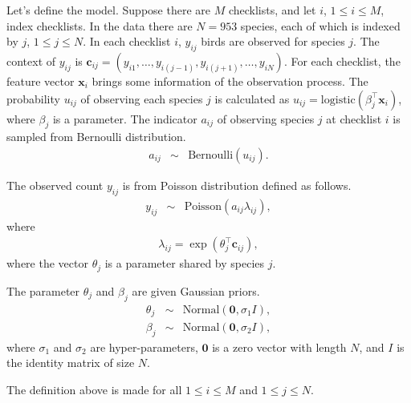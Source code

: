 \documentclass{article}
\begin{document}
Let's define the model. Suppose there are $M$ checklists, and let $i$, $1 \le i \le M$, index checklists. In the data there are $N = 953$ species, each of which is indexed by $j$, $1 \le j \le N$.  
In each checklist $i$, $y_{ij}$ birds are observed for species $j$. The context of $y_{ij}$ is $\mathbf{c}_{ij} = (y_{i1}, \ldots, y_{i(j-1)}, y_{i(j+1)}, \ldots, y_{iN})$. For each checklist, the feature vector $\mathbf{x}_{i}$ brings some information of the observation process. The probability $u_{ij}$ of observing each species $j$ is calculated as $u_{ij} = \mathrm{logistic}(\beta_j^\top \mathbf{x}_i)$, where $\beta_j$ is a parameter. The indicator $a_{ij}$ of observing species $j$ at checklist $i$ is sampled from Bernoulli distribution. 
\begin{eqnarray}
a_{ij} &\sim& \mathrm{Bernoulli}(u_{ij}).
\end{eqnarray}

The observed count $y_{ij}$ is from Poisson distribution defined as follows.   
\begin{eqnarray}
y_{ij} &\sim& \mathrm{Poisson}(a_{ij} \lambda_{ij}),
\end{eqnarray}
where 
\begin{eqnarray}
\lambda_{ij} = \exp(\theta_{j}^\top \mathbf{c}_{ij} ),
\end{eqnarray}
where the vector $\theta_j$ is a parameter shared by species $j$. 

The parameter $\theta_j$ and $\beta_j$ are given Gaussian priors. 
\begin{eqnarray}
\theta_j &\sim& \mathrm{Normal}(\mathbf{0}, \sigma_1 I), \\
\beta_j &\sim& \mathrm{Normal}(\mathbf{0}, \sigma_2 I),
\end{eqnarray}
where $\sigma_1$ and $\sigma_2$ are hyper-parameters, $\mathbf{0}$ is a zero vector with length $N$, and $I$ is the identity matrix of size $N$. 


The definition above is made for all $1 \le i \le M$ and $1 \le j \le N$. 
\end{document}
